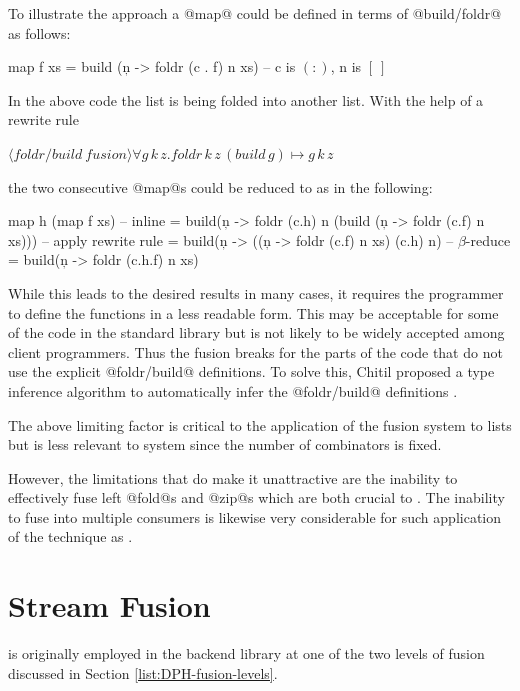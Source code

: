 \documentclass[preamble.tex]{subfiles}
\begin{document}
To illustrate the approach a @map@ could be defined in terms of @build/foldr@ as follows:

\begin{hscode}[mathescape]
map f xs = build (\c n -> foldr (c . f) n xs)
-- c is $\mathtt{(:)}$, n is $\mathtt{[\ ]}$
\end{hscode}


In the above code the list is being folded into another list. With the help of a rewrite rule

$\langle \mathit{foldr/build\ fusion} \rangle\forall g\, k\, z.\mathit{foldr}\, k\, z\,(build\, g)\mapsto g\, k\, z$

the two consecutive @map@s could be reduced to as in the following:

\begin{hscode}[mathescape]
map h (map f xs)
 -- inline
 = build(\c n -> foldr (c.h) n 
  (build (\c n -> foldr (c.f) n xs)))
 -- apply rewrite rule
 = build(\c n -> ((\c n -> foldr (c.f) n xs) (c.h) n)
 -- $\beta$-reduce
 = build(\c n -> foldr (c.h.f) n xs)
\end{hscode}


While this leads to the desired results in many cases, it requires the programmer to define the functions in a less readable form. This may be acceptable for some of the code in the standard library but is not likely to be widely accepted among client programmers. Thus the fusion breaks for the parts of the code that do not use the explicit @foldr/build@ definitions. To solve this, Chitil proposed a type inference algorithm to automatically infer the @foldr/build@ definitions \cite{Chi99}.

The above limiting factor is critical to the application of the fusion system to lists but is less relevant to \LiveFusion system since the number of combinators is fixed.

However, the limitations that do make it unattractive are the inability to effectively fuse left @fold@s and @zip@s which are both crucial to \DPH. The inability to fuse into multiple consumers is likewise very considerable for such application of the technique as \DPH.


\clearpage

\section{Stream Fusion}
\label{sec:Stream-Fusion}
\istreamfusion{}

 \cite{CLS07,CSL06} is originally employed in the \DPH backend library at one of the two levels of fusion discussed in Section \vref{list:DPH-fusion-levels}.
\end{document}
